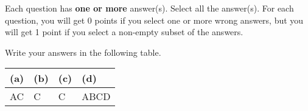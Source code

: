 
Each question has \textbf{one or more}  answer(s). Select all the  answer(s). For each question, you will get 0 points if you select one or more wrong answers, but you will get 1 point if you select a non-empty subset of the  answers.

Write your answers in the following table.


\begin{table}[htbp]
	\centering
	\begin{tabular}{|p{2cm}|p{2cm}|p{2cm}|p{2cm}|}
		\hline
		(a) & (b) & (c) & (d) \\
		\hline
		  AC  &  C  & C   & ABCD  \\
		\hline
	\end{tabular}
\end{table}

